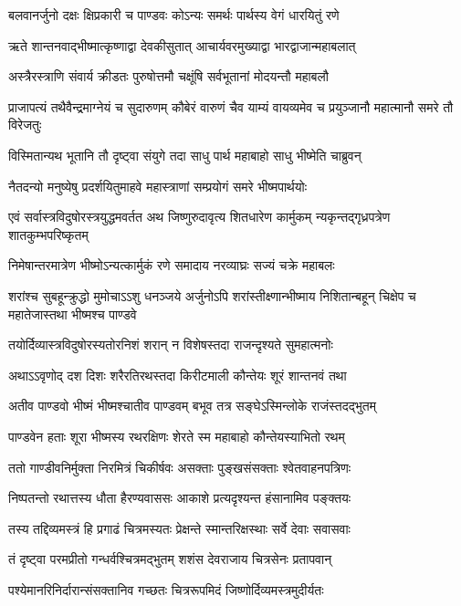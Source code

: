 \twolineshloka
{बलवानर्जुनो दक्षः क्षिप्रकारी च पाण्डवः}
{कोऽन्यः समर्थः पार्थस्य वेगं धारयितुं रणे}


\twolineshloka
{ऋते शान्तनवाद्भीष्मात्कृष्णाद्वा देवकीसुतात्}
{आचार्यवरमुख्याद्वा भारद्वाजान्महाबलात्}


\twolineshloka
{अस्त्रैरस्त्राणि संवार्य क्रीडतः पुरुषोत्तमौ}
{चक्षूंषि सर्वभूतानां मोदयन्तौ महाबलौ}


\threelineshloka
{प्राजापत्यं तथैवैन्द्रमाग्नेयं च सुदारुणम्}
{कौबेरं वारुणं चैव याम्यं वायव्यमेव च}
{प्रयुञ्जानौ महात्मानौ समरे तौ विरेजतुः}


\twolineshloka
{विस्मितान्यथ भूतानि तौ दृष्ट्वा संयुगे तदा}
{साधु पार्थ महाबाहो साधु भीष्मेति चाब्रुवन्}


\twolineshloka
{नैतदन्यो मनुष्येषु प्रदर्शयितुमाहवे}
{महास्त्राणां सम्प्रयोगं समरे भीष्मपार्थयोः}


\onelineshloka
{एवं सर्वास्त्रविदुषोरस्त्रयुद्धमवर्तत}
\twolineshloka
{अथ जिष्णुरुदावृत्य शितधारेण कार्मुकम्}
{न्यकृन्तद्गृध्रपत्रेण शातकुम्भपरिष्कृतम्}


\twolineshloka
{निमेषान्तरमात्रेण भीष्मोऽन्यत्कार्मुकं रणे}
{समादाय नरव्याघ्रः सज्यं चक्रे महाबलः}


\threelineshloka
{शरांश्च सुबहून्क्रुद्धो मुमोचाऽऽशु धनञ्जये}
{अर्जुनोऽपि शरांस्तीक्ष्णान्भीष्माय निशितान्बहून्}
{चिक्षेप च महातेजास्तथा भीष्मश्च पाण्डवे}


\twolineshloka
{तयोर्दिव्यास्त्रविदुषोरस्यतोरनिशं शरान्}
{न विशेषस्तदा राजन्दृश्यते सुमहात्मनोः}


\twolineshloka
{अथाऽऽवृणोद् दश दिशः शरैरतिरथस्तदा}
{किरीटमाली कौन्तेयः शूरं शान्तनवं तथा}


\twolineshloka
{अतीव पाण्डवो भीष्मं भीष्मश्चातीव पाण्डवम्}
{बभूव तत्र सङ्घेऽस्मिन्लोके राजंस्तदद्भुतम्}


\twolineshloka
{पाण्डवेन हताः शूरा भीष्मस्य रथरक्षिणः}
{शेरते स्म महाबाहो कौन्तेयस्याभितो रथम्}


\twolineshloka
{ततो गाण्डीवनिर्मुक्ता निरमित्रं चिकीर्षवः}
{असक्ताः पुङ्खसंसक्ताः श्वेतवाहनपत्रिणः}


\twolineshloka
{निष्पतन्तो रथात्तस्य धौता हैरण्यवाससः}
{आकाशे प्रत्यदृश्यन्त हंसानामिव पङ्क्तयः}


\twolineshloka
{तस्य तद्दिव्यमस्त्रं हि प्रगाढं चित्रमस्यतः}
{प्रेक्षन्ते स्मान्तरिक्षस्थाः सर्वे देवाः सवासवाः}


\twolineshloka
{तं दृष्ट्वा परमप्रीतो गन्धर्वश्चित्रमद्भुतम्}
{शशंस देवराजाय चित्रसेनः प्रतापवान्}


\twolineshloka
{पश्येमानरिनिर्दारान्संसक्तानिव गच्छतः}
{चित्ररूपमिदं जिष्णोर्दिव्यमस्त्रमुदीर्यतः}


